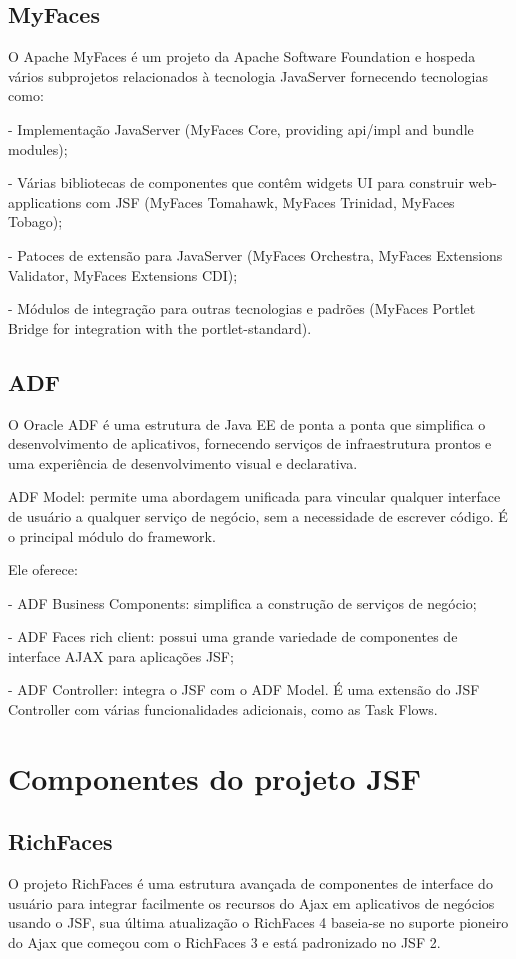 \documentclass[12pt,a4paper]{article}
\begin{document}
\subsection{MyFaces}
O Apache MyFaces é um projeto da Apache Software Foundation e hospeda vários subprojetos relacionados à tecnologia JavaServer fornecendo tecnologias como:

- Implementação JavaServer (MyFaces Core, providing api/impl and bundle modules);

- Várias bibliotecas de componentes que contêm widgets UI para construir web-applications com JSF (MyFaces Tomahawk, MyFaces Trinidad, MyFaces Tobago);

- Patoces de extensão para JavaServer (MyFaces Orchestra, MyFaces Extensions Validator, MyFaces Extensions CDI);

- Módulos de integração para outras tecnologias e padrões (MyFaces Portlet Bridge for integration with the portlet-standard).

\subsection{ADF}
O Oracle ADF é uma estrutura de Java EE de ponta a ponta que simplifica o desenvolvimento de aplicativos, fornecendo serviços de infraestrutura prontos e uma experiência de desenvolvimento visual e declarativa.

ADF Model: permite uma abordagem unificada para vincular qualquer interface de usuário a qualquer serviço de negócio, sem a necessidade de escrever código. É o principal módulo do framework.

Ele oferece:

- ADF Business Components: simplifica a construção de serviços de negócio;

- ADF Faces rich client: possui uma grande variedade de componentes de interface AJAX para aplicações JSF;

- ADF Controller: integra o JSF com o ADF Model. É uma extensão do JSF Controller com várias funcionalidades adicionais, como as Task Flows.

\section{Componentes do projeto JSF}
\subsection{RichFaces}
O projeto RichFaces é uma estrutura avançada de componentes de interface do usuário para integrar facilmente os recursos do Ajax em aplicativos de negócios usando o JSF, sua última atualização o RichFaces 4 baseia-se no suporte pioneiro do Ajax que começou com o RichFaces 3 e está padronizado no JSF 2.
\end{document}
